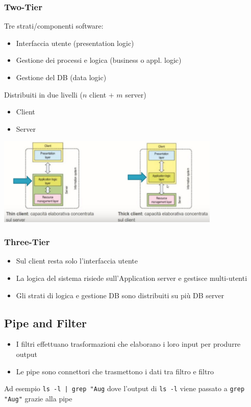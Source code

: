 \documentclass[12pt, a4paper]{report}
\begin{document}
\subsubsection{Two-Tier}
Tre strati/componenti software:
\begin{itemize}
    \item Interfaccia utente (presentation logic)
    \item Gestione dei processi e logica (business o appl. logic)
    \item Gestione del DB (data logic)
\end{itemize}
Distribuiti in due livelli ($n$ client + $m$ server)
\begin{itemize}
    \item Client
    \item Server
\end{itemize}
\begin{center}
    \includegraphics[width=0.8\textwidth]{Immagini/thinclientfatclient.png}
\end{center}
\subsubsection{Three-Tier}
\begin{itemize}
    \item Sul client resta solo l'interfaccia utente
    \item La logica del sistema risiede sull'Application server e gestisce multi-utenti
    \item Gli strati di logica e gestione DB sono distribuiti su più DB server
\end{itemize}
\subsection{Pipe and Filter}
\begin{itemize}
    \item I filtri effettuano trasformazioni che elaborano i loro input per produrre output
    \item Le pipe sono connettori che trasmettono i dati tra filtro e filtro
\end{itemize}
Ad esempio \texttt{ls -l | grep "Aug} dove l'output di \texttt{ls -l} viene passato a \texttt{grep "Aug"} grazie alla pipe
\end{document}
